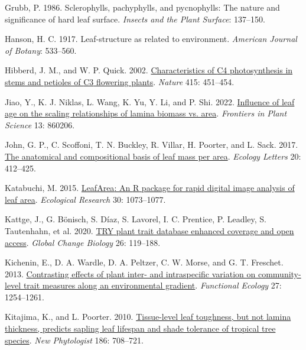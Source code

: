 \documentclass[
  12pt,
  a4paper,
,tablecaptionabove
]{scrartcl}
\newlength{\cslhangindent}
\newenvironment{CSLReferences}[2] %
 {%
  \setlength{\parindent}{0pt}
  \ifodd #1 \everypar{\setlength{\hangindent}{\cslhangindent}}\ignorespaces\fi
  \ifnum #2 > 0
  \setlength{\parskip}{#2\baselineskip}
  \fi
 }%
 {}
\begin{document}
\begin{CSLReferences}{1}{0}
\leavevmode{}%
Grubb, P. 1986. Sclerophylls, pachyphylls, and pycnophylls: {The} nature and significance of hard leaf surface. \emph{Insects and the Plant Surface}: 137--150.

\leavevmode{}%
Hanson, H. C. 1917. Leaf-structure as related to environment. \emph{American Journal of Botany}: 533--560.

\leavevmode{}%
Hibberd, J. M., and W. P. Quick. 2002. \href{https://doi.org/10.1038/415451a}{Characteristics of {C4} photosynthesis in stems and petioles of {C3} flowering plants}. \emph{Nature} 415: 451--454.

\leavevmode{}%
Jiao, Y., K. J. Niklas, L. Wang, K. Yu, Y. Li, and P. Shi. 2022. \href{https://doi.org/10.3389/fpls.2022.860206}{Influence of leaf age on the scaling relationships of lamina biomass vs. area}. \emph{Frontiers in Plant Science} 13: 860206.

\leavevmode{}%
John, G. P., C. Scoffoni, T. N. Buckley, R. Villar, H. Poorter, and L. Sack. 2017. \href{https://doi.org/10.1111/ele.12739}{The anatomical and compositional basis of leaf mass per area}. \emph{Ecology Letters} 20: 412--425.

\leavevmode{}%
Katabuchi, M. 2015. \href{https://doi.org/10.1007/s11284-015-1307-x}{{LeafArea}: An {R} package for rapid digital image analysis of leaf area}. \emph{Ecological Research} 30: 1073--1077.

\leavevmode{}%
Kattge, J., G. Bönisch, S. Díaz, S. Lavorel, I. C. Prentice, P. Leadley, S. Tautenhahn, et al. 2020. \href{https://doi.org/10.1111/gcb.14904}{{TRY} plant trait database \textendash{} enhanced coverage and open access}. \emph{Global Change Biology} 26: 119--188.

\leavevmode{}%
Kichenin, E., D. A. Wardle, D. A. Peltzer, C. W. Morse, and G. T. Freschet. 2013. \href{https://doi.org/10.1111/1365-2435.12116}{Contrasting effects of plant inter- and intraspecific variation on community-level trait measures along an environmental gradient}. \emph{Functional Ecology} 27: 1254--1261.

\leavevmode{}%
Kitajima, K., and L. Poorter. 2010. \href{https://doi.org/10.1111/j.1469-8137.2010.03212.x}{Tissue-level leaf toughness, but not lamina thickness, predicts sapling leaf lifespan and shade tolerance of tropical tree species}. \emph{New Phytologist} 186: 708--721.


\end{CSLReferences}
\end{document}
